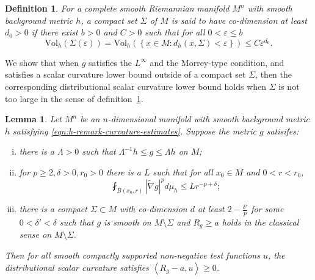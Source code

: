 \documentclass[12pt]{amsart}
\newcommand{\hdel}{\tilde{\nabla}}
\newtheorem{lma}[thm]{Lemma}
\newtheorem{defn}[thm]{Definition}
\theoremstyle{remark}
\numberwithin{equation}{section}
\begin{document}
\begin{defn}\label{defn:codim}
For a complete smooth Riemannian manifold $M^n$ with smooth background metric $h$, a compact set $\Sigma$ of $M$ is said to have co-dimension at least $d_0 > 0$ if there exist $b > 0$ and $C > 0$ such that for all $0 < \varepsilon \leq b$
\begin{equation*}
    \text{Vol}_h\left(\Sigma(\varepsilon)\right) = \text{Vol}_h\left(\left\{x \in M : d_h(x,\Sigma) < \varepsilon\right\}\right) \leq C\varepsilon^{d_0}.
\end{equation*}
\end{defn}

We show that when $g$ satisfies the $L^\infty$ and the Morrey-type condition, and satisfies a scalar curvature lower bound outside of a compact set $\Sigma$, then the corresponding distributional scalar curvature lower bound holds when $\Sigma$ is not too large in the sense of definition~\ref{defn:codim}.

\begin{lma}\label{lem:distributional-scalar-curvature}
    Let $M^n$ be an $n$-dimensional manifold with smooth background metric $h$ satisfying \eqref{eqn:h-remark-curvature-estimates}. Suppose the metric $g$ satisifes:
    \begin{enumerate}[(i)]
        \item there is a $\Lambda > 0$ such that $\Lambda^{-1}h \leq g \leq \Lambda h$ on $M$;
        \item for $p \geq 2, \delta > 0, r_0 > 0$ there is a $L$ such that for all $x_0 \in M$ and $0 < r < r_0$,
        \begin{equation}
            \fint_{B(x_0, r)} |\hdel g|^p d\mu_h \leq L r^{-p + \delta};
        \end{equation}
        \item there is a compact $\Sigma \subset M$ with co-dimension $d$ at least $2 - \frac{\delta'}{p}$ for some $0<\delta'<\delta$ such that $g$ is smooth on $M \setminus \Sigma$ and $R_g \geq a$ holds in the classical sense on $M \setminus \Sigma$.
    \end{enumerate}
    Then for all smooth compactly supported non-negative test functions $u$, the distributional scalar curvature satisfies $\left\langle R_g - a, u \right\rangle \geq 0$.
\end{lma}
\end{document}
